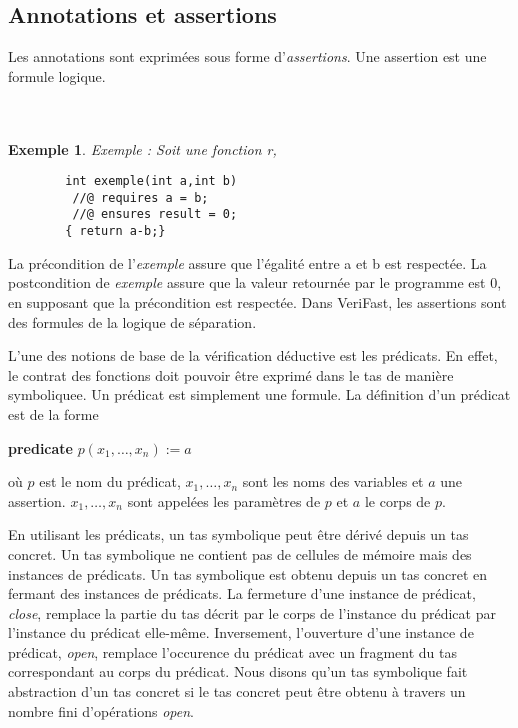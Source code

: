 \documentclass[11pt,openany]{article}
\newcommand{\verifast}{VeriFast}
\newtheorem{exemple}{Exemple}
\begin{document}
	\subsection{Annotations et assertions}
		 Les annotations sont exprim\'ees sous forme d'\textit{assertions}. Une assertion est une formule logique. \\ \\ \\
		 
		\begin{exemple}
		Exemple : Soit une fonction r,
		\begin{lstlisting}
		int exemple(int a,int b)
		 //@ requires a = b;
		 //@ ensures result = 0;
		{ return a-b;}
		\end{lstlisting}
		\end{exemple}
		
	
		La pr\'econdition de l'\textit{exemple} assure que l'\'egalit\'e entre a et b est respect\'ee. La postcondition de \textit{exemple} assure que la valeur retourn\'ee par le programme est 0, en supposant que la pr\'econdition est respect\'ee. Dans \verifast, les assertions sont des formules de la logique de s\'eparation.
	
	L'une des notions de base de la v\'erification d\'eductive est les pr\'edicats. En effet, le contrat des fonctions doit pouvoir \^etre exprim\'e dans le tas de mani\`ere symboliquee. Un pr\'edicat est simplement une formule. La d\'efinition d'un pr\'edicat est de la forme
	\begin{center}
	
		\textbf{predicate} $p(x_1,\ldots,x_n):=a$

	\end{center}
o\`u $p$ est le nom du pr\'edicat, $x_1,\ldots,x_n$ sont les noms des variables et $a$ une assertion. $x_1,\ldots,x_n$ sont appel\'ees les param\`etres de $p$ et $a$ le corps de $p$.


	En utilisant les pr\'edicats, un tas symbolique peut \^etre d\'eriv\'e depuis un tas concret. Un tas symbolique ne contient pas de cellules de m\'emoire mais des instances de pr\'edicats. Un tas symbolique est obtenu depuis un tas concret en fermant des instances de pr\'edicats. La fermeture d'une instance de pr\'edicat, \textit{close}, remplace la partie du tas d\'ecrit par le corps de l'instance du pr\'edicat par l'instance du pr\'edicat elle-m\^eme. Inversement, l'ouverture d'une instance de pr\'edicat, \textit{open}, remplace l'occurence du pr\'edicat avec un fragment du tas correspondant au corps du pr\'edicat. Nous disons qu'un tas symbolique fait abstraction d'un tas concret si le tas concret peut \^etre obtenu \`a travers un nombre fini d'op\'erations \textit{open}.
	
\end{document}
